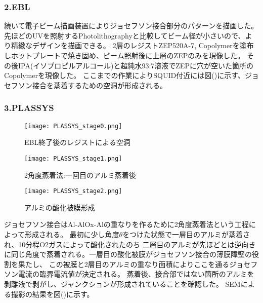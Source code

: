 \subsubsection{2.EBL}
続いて電子ビーム描画装置によりジョセフソン接合部分のパターンを描画した。
先ほどのUVを照射するPhotolithographyと比較してビーム径が小さいので、より精緻なデザインを描画できる。
2層のレジストZEP520A-7, Copolymerを塗布しホットプレートで焼き固め、ビーム照射後に上層のZEPのみを現像した。
その後IPA(イソプロピルアルコール)と超純水93:7溶液でZEPに穴が空いた箇所のCopolymerを現像した。
ここまでの作業によりSQUID付近には図()に示す、ジョセフソン接合を蒸着するための空洞が形成される。
\subsubsection{3.PLASSYS}
\begin{figure}[H]
    \begin{center}
        \texttt{[image: PLASSYS\_stage0.png]}
        \caption{EBL終了後のレジストによる空洞}
    \end{center}
\end{figure}
\begin{figure}[H]
    \begin{center}
        \texttt{[image: PLASSYS\_stage1.png]}
        \caption{2角度蒸着法:一回目のアルミ蒸着後}
    \end{center}
\end{figure}
\begin{figure}[H]
    \begin{center}
        \texttt{[image: PLASSYS\_stage2.png]}
        \caption{アルミの酸化被膜形成}
    \end{center}
\end{figure}
ジョセフソン接合はAl-AlOx-Alの重なりを作るために2角度蒸着法という工程によって形成される。
最初に少し角度$\theta$をつけた状態で一層目のアルミが蒸着され、10分程O2ガスによって酸化されたのち
二層目のアルミが先ほどとは逆向きに同じ角度で蒸着される。一層目の酸化被膜がジョセフソン接合の薄膜障壁の役割を果たし、
この被膜と2層目のアルミの重なり面積によりここを通るジョセフソン電流の臨界電流値が決定される。
蒸着後、接合部ではない箇所のアルミを剥離液で剥がし、ジャンクションが形成されていることを確認した。
SEMによる撮影の結果を図()に示す。
